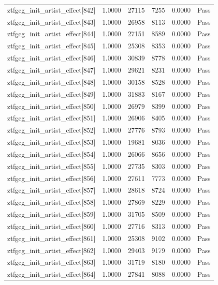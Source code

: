 \begin{table}[htbp]
\begin{tabular}{llrrll}
ztfgcg\_init\_artist\_effect[842] & 1.0000 & 27115 & 7255 & 0.0000 & Pass \\
ztfgcg\_init\_artist\_effect[843] & 1.0000 & 26958 & 8113 & 0.0000 & Pass \\
ztfgcg\_init\_artist\_effect[844] & 1.0000 & 27151 & 8589 & 0.0000 & Pass \\
ztfgcg\_init\_artist\_effect[845] & 1.0000 & 25308 & 8353 & 0.0000 & Pass \\
ztfgcg\_init\_artist\_effect[846] & 1.0000 & 30839 & 8778 & 0.0000 & Pass \\
ztfgcg\_init\_artist\_effect[847] & 1.0000 & 29621 & 8231 & 0.0000 & Pass \\
ztfgcg\_init\_artist\_effect[848] & 1.0000 & 30158 & 8528 & 0.0000 & Pass \\
ztfgcg\_init\_artist\_effect[849] & 1.0000 & 31883 & 8167 & 0.0000 & Pass \\
ztfgcg\_init\_artist\_effect[850] & 1.0000 & 26979 & 8399 & 0.0000 & Pass \\
ztfgcg\_init\_artist\_effect[851] & 1.0000 & 26906 & 8405 & 0.0000 & Pass \\
ztfgcg\_init\_artist\_effect[852] & 1.0000 & 27776 & 8793 & 0.0000 & Pass \\
ztfgcg\_init\_artist\_effect[853] & 1.0000 & 19681 & 8036 & 0.0000 & Pass \\
ztfgcg\_init\_artist\_effect[854] & 1.0000 & 26066 & 8656 & 0.0000 & Pass \\
ztfgcg\_init\_artist\_effect[855] & 1.0000 & 27735 & 8303 & 0.0000 & Pass \\
ztfgcg\_init\_artist\_effect[856] & 1.0000 & 27611 & 7773 & 0.0000 & Pass \\
ztfgcg\_init\_artist\_effect[857] & 1.0000 & 28618 & 8724 & 0.0000 & Pass \\
ztfgcg\_init\_artist\_effect[858] & 1.0000 & 27869 & 8229 & 0.0000 & Pass \\
ztfgcg\_init\_artist\_effect[859] & 1.0000 & 31705 & 8509 & 0.0000 & Pass \\
ztfgcg\_init\_artist\_effect[860] & 1.0000 & 27716 & 8313 & 0.0000 & Pass \\
ztfgcg\_init\_artist\_effect[861] & 1.0000 & 25308 & 9102 & 0.0000 & Pass \\
ztfgcg\_init\_artist\_effect[862] & 1.0000 & 29403 & 9179 & 0.0000 & Pass \\
ztfgcg\_init\_artist\_effect[863] & 1.0000 & 31719 & 8180 & 0.0000 & Pass \\
ztfgcg\_init\_artist\_effect[864] & 1.0000 & 27841 & 8088 & 0.0000 & Pass \\

\end{tabular}
\end{table}
